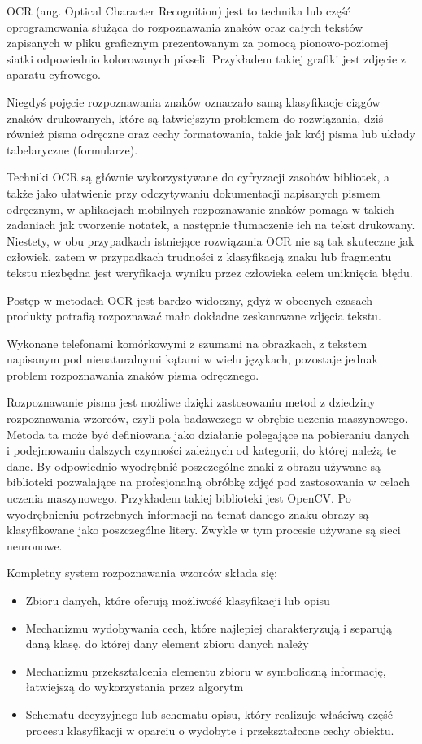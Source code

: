 \documentclass[brudnopis]{xmgr}
\begin{document}
OCR\cite{20} (ang. Optical Character Recognition) jest to technika lub część oprogramowania służąca do rozpoznawania znaków oraz całych tekstów zapisanych w pliku graficznym prezentowanym za pomocą pionowo-poziomej siatki odpowiednio kolorowanych pikseli. Przykładem takiej grafiki jest zdjęcie z aparatu cyfrowego. 

Niegdyś pojęcie rozpoznawania znaków oznaczało samą klasyfikacje ciągów znaków drukowanych, które są łatwiejszym problemem do rozwiązania, dziś również pisma odręczne oraz cechy formatowania, takie jak krój pisma lub układy tabelaryczne (formularze).

Techniki OCR są głównie wykorzystywane do cyfryzacji zasobów bibliotek, a także jako ułatwienie przy odczytywaniu dokumentacji napisanych pismem odręcznym, w aplikacjach mobilnych rozpoznawanie znaków pomaga w takich zadaniach jak tworzenie notatek, a następnie tłumaczenie ich na tekst drukowany. Niestety, w obu przypadkach istniejące rozwiązania OCR nie są tak skuteczne jak człowiek, zatem w przypadkach trudności z klasyfikacją znaku lub fragmentu tekstu niezbędna jest weryfikacja wyniku przez człowieka celem uniknięcia błędu.

Postęp w metodach OCR jest bardzo widoczny, gdyż w obecnych czasach produkty potrafią rozpoznawać mało dokładne zeskanowane zdjęcia tekstu.

Wykonane telefonami komórkowymi z szumami na obrazkach, z tekstem napisanym pod nienaturalnymi kątami w wielu językach, pozostaje jednak problem rozpoznawania znaków pisma odręcznego.

Rozpoznawanie pisma jest możliwe dzięki zastosowaniu metod z dziedziny rozpoznawania wzorców, czyli pola badawczego w obrębie uczenia maszynowego. Metoda ta może być definiowana jako działanie polegające na pobieraniu danych i podejmowaniu dalszych czynności zależnych od kategorii, do której należą te dane. By odpowiednio wyodrębnić poszczególne znaki z obrazu używane są biblioteki pozwalające na profesjonalną obróbkę zdjęć pod zastosowania w celach uczenia maszynowego. Przykładem takiej biblioteki jest OpenCV. Po wyodrębnieniu potrzebnych informacji na temat danego znaku obrazy są klasyfikowane jako poszczególne litery. Zwykle w tym procesie używane są sieci neuronowe.

Kompletny system rozpoznawania wzorców składa się:
\begin{itemize}
\item
Zbioru danych, które oferują możliwość klasyfikacji lub opisu
\item
Mechanizmu wydobywania cech, które najlepiej charakteryzują i separują daną klasę, do której dany element zbioru danych należy
\item
Mechanizmu przekształcenia elementu zbioru w symboliczną informację, łatwiejszą do wykorzystania przez algorytm
\item
Schematu decyzyjnego lub schematu opisu, który realizuje właściwą część procesu klasyfikacji w oparciu o wydobyte i przekształcone cechy obiektu.
\end{itemize}
\end{document}
